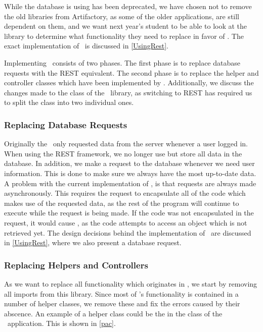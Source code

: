 While the database  is using has been deprecated, we have
chosen not to remove the old libraries from Artifactory, as some of the older
applications, are still dependent on them, and we want next year's student to
be able to look at the library to determine what functionality they need to
replace in favor of \rlib. The exact implementation of \rlib\ is discussed in
\autoref{UsingRest}.\nl

Implementing \rlib\ consists of two phases. The first phase is to replace
database requests with the REST equivalent. The second phase is to replace
the helper and controller classes which have been implemented by .
Additionally, we discuss the changes made to the 
class of the \rlib\ library, as switching to REST has required us to split the
class into two individual ones.

\subsubsection{Replacing Database Requests}
Originally the \lapp\ only requested data from the server whenever a user
logged in. When using the REST framework, we no longer use
 but store all data in the database. In addition, we make
a request to the database whenever we need user information. This is done to
make sure we always have the most up-to-date data. A problem with the current
implementation of \rlib, is that requests are always made asynchronously. This
requires the request to encapsulate all of the code which makes use of the
requested data, as the rest of the program will continue to execute while the
request is being made. If the code was not encapsulated in the request, it would
cause , as the code attempts to access an object
which is not retrieved yet. The design decisions behind the implementation of
\rlib\ are discussed in \autoref{UsingRest}, where we also present a database
request.

\subsubsection{Replacing Helpers and Controllers}
As we want to replace all functionality which originates in , we
start by removing all imports from this library. Since most of 's
functionality is contained in a number of helper classes, we remove these and
fix the errors caused by their abscence. An example of a helper class could be
the  in the  class of
the \lapp\ application.
This is shown in \autoref{pac}.\nl

